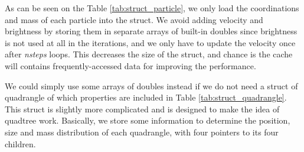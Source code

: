 \documentclass[12pt,oneside,a4paper]{article}
\begin{document}
\begin{table}[h]
\centering
\caption{Struct \textbf{quadrangle} - a quadrangle object}
\label{tab:struct_quadrangle}
\hspace*{-0.7cm}
\end{table}

As can be seen on the Table \ref{tab:struct_particle}, we only load the coordinations and mass of each particle into the struct. We avoid adding velocity and brightness by storing them in separate arrays of built-in doubles since brightness is not used at all in the iterations, and we only have to update the velocity once after \textit{nsteps} loops. This decreases the size of the struct, and chance is the cache will contains frequently-accessed data for improving the performance.

We could simply use some arrays of doubles instead if we do not need a struct of quadrangle of which properties are included in Table \ref{tab:struct_quadrangle}. This struct is slightly more complicated and is designed to make the idea of quadtree work. Basically, we store some information to determine the position, size and mass distribution of each quadrangle, with four pointers to its four children.
\end{document}
